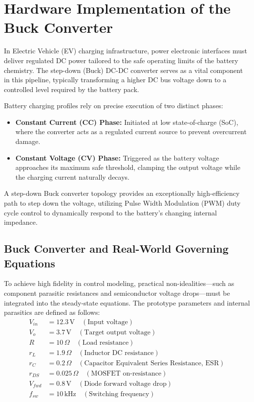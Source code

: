\graphicspath{{../2/figures/}}
\section{Hardware Implementation of the Buck Converter}
In Electric Vehicle (EV) charging infrastructure, power electronic interfaces must deliver regulated DC power tailored to the safe operating limits of the battery chemistry. The step-down (Buck) DC-DC converter serves as a vital component in this pipeline, typically transforming a higher DC bus voltage down to a controlled level required by the battery pack. 

Battery charging profiles rely on precise execution of two distinct phases:
\begin{itemize}
    \item \textbf{Constant Current (CC) Phase:} Initiated at low state-of-charge (SoC), where the converter acts as a regulated current source to prevent overcurrent damage.
    \item \textbf{Constant Voltage (CV) Phase:} Triggered as the battery voltage approaches its maximum safe threshold, clamping the output voltage while the charging current naturally decays.
\end{itemize}

A step-down Buck converter topology provides an exceptionally high-efficiency path to step down the voltage, utilizing Pulse Width Modulation (PWM) duty cycle control to dynamically respond to the battery's changing internal impedance.

\subsection{Buck Converter and Real-World Governing Equations}
To achieve high fidelity in control modeling, practical non-idealities—such as component parasitic resistances and semiconductor voltage drops—must be integrated into the steady-state equations. The prototype parameters and internal parasitics are defined as follows:
\begin{align*}
V_{in} &= 12.3\,\text{V} \quad (\text{Input voltage}) \\
V_o &= 3.7\,\text{V} \quad (\text{Target output voltage}) \\
R &= 10\,\Omega \quad (\text{Load resistance}) \\
r_L &= 1.9\,\Omega \quad (\text{Inductor DC resistance}) \\
r_C &= 0.2\,\Omega \quad (\text{Capacitor Equivalent Series Resistance, ESR}) \\
r_{DS} &= 0.025\,\Omega \quad (\text{MOSFET on-resistance}) \\
V_{fwd} &= 0.8\,\text{V} \quad (\text{Diode forward voltage drop}) \\
f_{sw} &= 10\,\text{kHz} \quad (\text{Switching frequency})
\end{align*}

